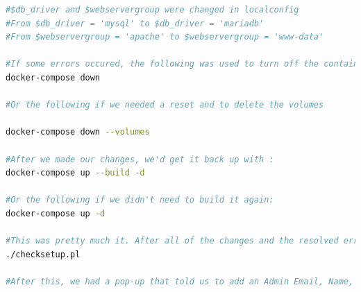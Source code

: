 \begin{lstlisting}[style=linuxstyle, language=bash]
#$db_driver and $webservergroup were changed in localconfig
#From $db_driver = 'mysql' to $db_driver = 'mariadb'
#From $webservergroup = 'apache' to $webservergroup = 'www-data'

#If some errors occured, the following was used to turn off the container:
docker-compose down

#Or the following if we needed a reset and to delete the volumes

docker-compose down --volumes

#After we made our changes, we'd get it back up with :
docker-compose up --build -d

#Or the following if we didn't need to build it again:
docker-compose up -d

#This was pretty much it. After all of the changes and the resolved errors, the following was the last line of code used in the exec root directory:
./checksetup.pl

#After this, we had a pop-up that told us to add an Admin Email, Name, and Password. There was no code, just direct inputs in the terminal. After all of this, we managed to get the Bugzilla website running through our Digital Ocean with a working admin account.

  
\end{lstlisting}